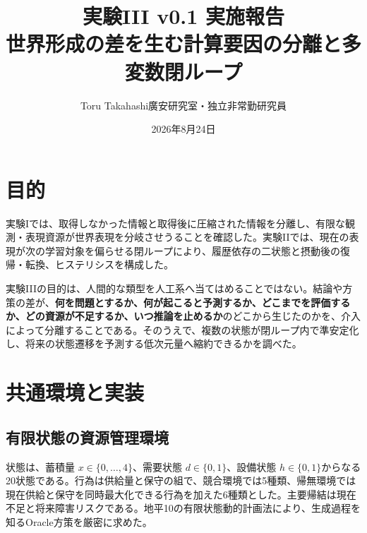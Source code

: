 \documentclass[11pt,a4paper]{ltjsarticle}
\title{\vspace{-1.3em}\textbf{実験III v0.1 実施報告}\\\large 世界形成の差を生む計算要因の分離と多変数閉ループ}
\author{Toru Takahashi\quad 廣安研究室・独立非常勤研究員}
\date{2026年8月24日}
\begin{document}
\maketitle

\begin{center}
\end{center}

\section{目的}

実験Iでは、取得しなかった情報と取得後に圧縮された情報を分離し、有限な観測・表現資源が世界表現を分岐させうることを確認した。実験IIでは、現在の表現が次の学習対象を偏らせる閉ループにより、履歴依存の二状態と摂動後の復帰・転換、ヒステリシスを構成した。

実験IIIの目的は、人間的な類型を人工系へ当てはめることではない。結論や方策の差が、\textbf{何を問題とするか、何が起こると予測するか、どこまでを評価するか、どの資源が不足するか、いつ推論を止めるか}のどこから生じたのかを、介入によって分離することである。そのうえで、複数の状態が閉ループ内で準安定化し、将来の状態遷移を予測する低次元量へ縮約できるかを調べた。

\section{共通環境と実装}

\subsection{有限状態の資源管理環境}

状態は、蓄積量 $x\in\{0,\ldots,4\}$、需要状態 $d\in\{0,1\}$、設備状態 $h\in\{0,1\}$からなる20状態である。行為は供給量と保守の組で、競合環境では5種類、帰無環境では現在供給と保守を同時最大化できる行為を加えた6種類とした。主要帰結は現在不足と将来障害リスクである。地平10の有限状態動的計画法により、生成過程を知るOracle方策を厳密に求めた。
\end{document}
